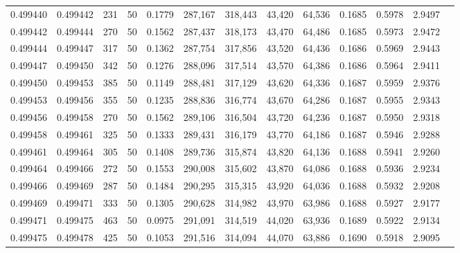 \begin{tabular}{rrrrrrrrrrrrr}
0.499440 & 0.499442 & 231 &  50 &                                     0.1779 & 287,167 & 318,443 &  43,420 &  64,536 & 0.1685 & 0.5978 & 2.9497 \\
0.499442 & 0.499444 & 270 &  50 &                                     0.1562 & 287,437 & 318,173 &  43,470 &  64,486 & 0.1685 & 0.5973 & 2.9472 \\
0.499444 & 0.499447 & 317 &  50 &                                     0.1362 & 287,754 & 317,856 &  43,520 &  64,436 & 0.1686 & 0.5969 & 2.9443 \\
0.499447 & 0.499450 & 342 &  50 &                                     0.1276 & 288,096 & 317,514 &  43,570 &  64,386 & 0.1686 & 0.5964 & 2.9411 \\
0.499450 & 0.499453 & 385 &  50 &                                     0.1149 & 288,481 & 317,129 &  43,620 &  64,336 & 0.1687 & 0.5959 & 2.9376 \\
0.499453 & 0.499456 & 355 &  50 &                                     0.1235 & 288,836 & 316,774 &  43,670 &  64,286 & 0.1687 & 0.5955 & 2.9343 \\
0.499456 & 0.499458 & 270 &  50 &                                     0.1562 & 289,106 & 316,504 &  43,720 &  64,236 & 0.1687 & 0.5950 & 2.9318 \\
0.499458 & 0.499461 & 325 &  50 &                                     0.1333 & 289,431 & 316,179 &  43,770 &  64,186 & 0.1687 & 0.5946 & 2.9288 \\
0.499461 & 0.499464 & 305 &  50 &                                     0.1408 & 289,736 & 315,874 &  43,820 &  64,136 & 0.1688 & 0.5941 & 2.9260 \\
0.499464 & 0.499466 & 272 &  50 &                                     0.1553 & 290,008 & 315,602 &  43,870 &  64,086 & 0.1688 & 0.5936 & 2.9234 \\
0.499466 & 0.499469 & 287 &  50 &                                     0.1484 & 290,295 & 315,315 &  43,920 &  64,036 & 0.1688 & 0.5932 & 2.9208 \\
0.499469 & 0.499471 & 333 &  50 &                                     0.1305 & 290,628 & 314,982 &  43,970 &  63,986 & 0.1688 & 0.5927 & 2.9177 \\
0.499471 & 0.499475 & 463 &  50 &                                     0.0975 & 291,091 & 314,519 &  44,020 &  63,936 & 0.1689 & 0.5922 & 2.9134 \\
0.499475 & 0.499478 & 425 &  50 &                                     0.1053 & 291,516 & 314,094 &  44,070 &  63,886 & 0.1690 & 0.5918 & 2.9095 \\

\end{tabular}
